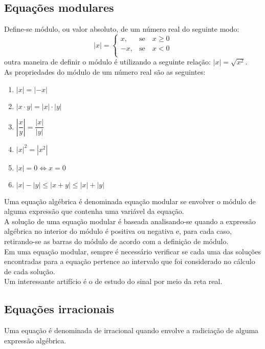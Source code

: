\documentclass{article}
\begin{document}
\subsection{Equações modulares}
Define-se módulo, ou valor absoluto, de um número real do seguinte modo:
\begin{equation*}
    |x|=\begin{cases}
        x, &\text{se}\quad x\geq 0\\
        -x, &\text{se}\quad x< 0\\
    \end{cases}
\end{equation*}
outra maneira de definir o módulo é utilizando a seguinte relação: $|x|=\sqrt{x^2}$.\\
\indent As propriedades do módulo de um número real são as seguintes:
\begin{enumerate}
    \item $|x|=|-x|$
    \item $|x\cdot y|=|x|\cdot|y|$
    \item $\left|\dfrac{x}{y}\right|=\dfrac{|x|}{|y|}$
    \item $|x|^2=|x^2|$
    \item $|x|=0\Leftrightarrow x=0$
    \item $|x|-|y|\leq|x+y|\leq|x|+|y|$
\end{enumerate}
\indent \indent Uma equação algébrica é denominada equação modular se envolver o módulo de alguma expressão que contenha uma variável da equação.\\
\indent A solução de uma equação modular é baseada analisando-se quando a expressão algébrica no interior do módulo é positiva ou negativa e, para cada caso, retirando-se as barras do módulo de acordo com a definição de módulo.\\
\indent Em uma equação modular, sempre é necessário verificar se cada uma das soluções encontradas para a equação pertence ao intervalo que foi considerado no cálculo de cada solução.\\
\indent Um interessante artifício é o de estudo do sinal por meio da reta real.

\subsection{Equações irracionais}
Uma equação é denominada de irracional quando envolve a radiciação de alguma expressão algébrica.
\end{document}
